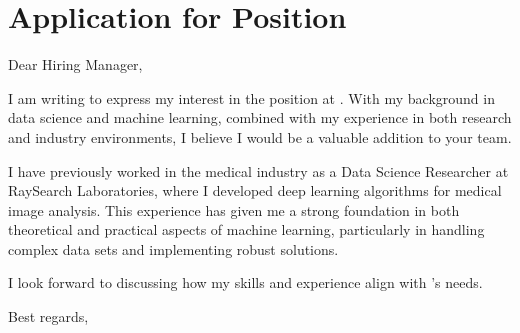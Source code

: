 \section{Application for  Position}

Dear Hiring Manager,

I am writing to express my interest in the  position at . With my background in data science and machine learning, combined with my experience in both research and industry environments, I believe I would be a valuable addition to your team.


I have previously worked in the medical industry as a Data Science Researcher at RaySearch Laboratories, where I developed deep learning algorithms for medical image analysis. This experience has given me a strong foundation in both theoretical and practical aspects of machine learning, particularly in handling complex data sets and implementing robust solutions.

I look forward to discussing how my skills and experience align with 's needs.

Best regards,
 